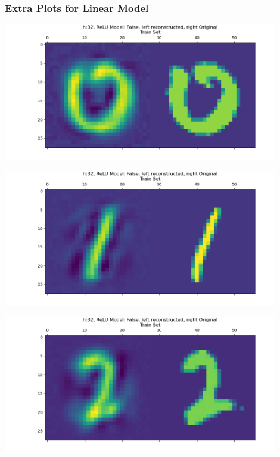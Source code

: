 \documentclass[]{article}
\begin{document}
        \subsubsection*{Extra Plots for Linear Model}\label{extra-a4-lin}
            \begin{center}
                \includegraphics*[width=12cm]{./A4plots/06-39-48-h-32-lin-digit-0.png}
            \end{center}
            \begin{center}
                \includegraphics*[width=12cm]{./A4plots/06-39-48-h-32-lin-digit-1.png}
            \end{center}
            \begin{center}
                \includegraphics*[width=12cm]{./A4plots/06-39-49-h-32-lin-digit-2.png}
            \end{center}
\end{document}
